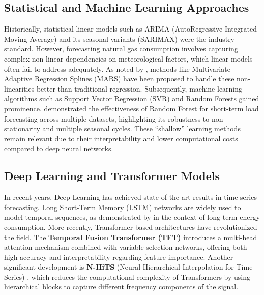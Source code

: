 \documentclass[journal,article,submit,pdftex,moreauthors]{Definitions/mdpi}
\begin{document}
\subsection{Statistical and Machine Learning Approaches}
Historically, statistical linear models such as ARIMA (AutoRegressive Integrated Moving Average) and its seasonal variants (SARIMAX) were the industry standard. However, forecasting natural gas consumption involves capturing complex non-linear dependencies on meteorological factors, which linear models often fail to address adequately. As noted by \citep{ref_mdpi_energies_1}, methods like Multivariate Adaptive Regression Splines (MARS) have been proposed to handle these non-linearities better than traditional regression.
Subsequently, machine learning algorithms such as Support Vector Regression (SVR) and Random Forests gained prominence. \citep{Dudek2021} demonstrated the effectiveness of Random Forest for short-term load forecasting across multiple datasets, highlighting its robustness to non-stationarity and multiple seasonal cycles. These ``shallow'' learning methods remain relevant due to their interpretability and lower computational costs compared to deep neural networks.


\subsection{Deep Learning and Transformer Models}
In recent years, Deep Learning has achieved state-of-the-art results in time series forecasting. Long Short-Term Memory (LSTM) networks are widely used to model temporal sequences, as demonstrated by \citep{ref_mdpi_math_1} in the context of long-term energy consumption. 
More recently, Transformer-based architectures have revolutionized the field. The \textbf{Temporal Fusion Transformer (TFT)} \citep{ref_tft} introduces a multi-head attention mechanism combined with variable selection networks, offering both high accuracy and interpretability regarding feature importance. Another significant development is \textbf{N-HiTS} (Neural Hierarchical Interpolation for Time Series) \citep{ref_nhits}, which reduces the computational complexity of Transformers by using hierarchical blocks to capture different frequency components of the signal.
\end{document}
